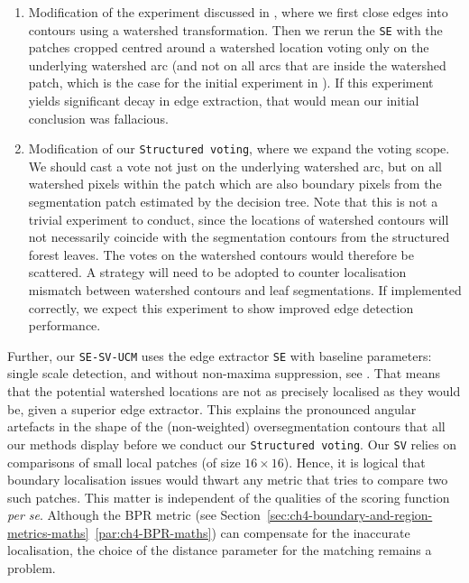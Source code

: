 \begin{enumerate}
 \item Modification of the experiment discussed in , where we first close edges into contours using a watershed transformation. Then we %
 rerun the {\tt SE} with the patches cropped centred around a watershed location voting only on the underlying watershed arc (and not on all arcs that are inside the watershed patch, which is the case for the initial experiment in ). If this experiment yields significant decay in edge extraction, that would mean our initial conclusion was fallacious.
 \item Modification of our {\tt Structured voting}, where we expand the voting scope. We should cast a vote not just on the underlying watershed arc, but on all watershed pixels within the patch which are also boundary pixels from the segmentation patch estimated by the decision tree. 
 Note that this is not a trivial experiment to conduct, since the locations of watershed contours will not necessarily coincide with the segmentation contours from the structured forest leaves. The votes on the watershed contours would therefore be scattered. %
 A strategy will need to be adopted to counter %
 localisation mismatch between watershed contours and leaf segmentations. 
 If implemented correctly, we expect this experiment to show improved edge detection performance.
\end{enumerate}

Further, our {\tt SE-SV-UCM} uses the edge extractor {\tt SE} with baseline parameters: single scale detection, and without non-maxima suppression, see . That means that the potential watershed locations are not as precisely %
localised as they would be, given %
a superior edge extractor. This explains the pronounced angular artefacts in the shape of the (non-weighted) oversegmentation contours that all our methods display before we conduct our {\tt Structured voting}. Our {\tt SV} relies on comparisons of small local patches (of size $16\times16$). Hence, it is logical that boundary localisation issues would thwart any metric that tries to compare two such patches. This matter is independent of the qualities of the scoring function {\it per se}. Although the BPR metric (see Section~\ref*{sec:ch4-boundary-and-region-metrics-maths}~\ref{par:ch4-BPR-maths}) can compensate for the inaccurate localisation, the choice of the distance parameter for the matching remains a problem. %

